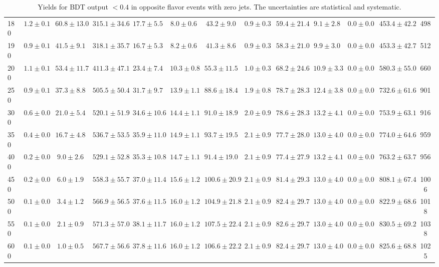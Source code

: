 \begin{table}
{\begin{center}
\begin{tabular}{l | c c | c c c c c c c c  | c c}
180 & $1.2\pm0.1$ & $60.8\pm13.0$ & $315.1\pm34.6$ & $17.7\pm5.5$ & $8.0\pm0.6$ & $43.2\pm9.0$ & $0.9\pm0.3$ & $59.4\pm21.4$ & $9.1\pm2.8$ & $0.0\pm0.0$ & $453.4\pm42.2$ & 498 \\
190 & $0.9\pm0.1$ & $41.5\pm9.1$ & $318.1\pm35.7$ & $16.7\pm5.3$ & $8.2\pm0.6$ & $41.3\pm8.6$ & $0.9\pm0.3$ & $58.3\pm21.0$ & $9.9\pm3.0$ & $0.0\pm0.0$ & $453.3\pm42.7$ & 512 \\
200 & $1.1\pm0.1$ & $53.4\pm11.7$ & $411.3\pm47.1$ & $23.4\pm7.4$ & $10.3\pm0.8$ & $55.3\pm11.5$ & $1.0\pm0.3$ & $68.2\pm24.6$ & $10.9\pm3.3$ & $0.0\pm0.0$ & $580.3\pm55.0$ & 660 \\
250 & $0.9\pm0.1$ & $37.3\pm8.8$ & $505.5\pm50.4$ & $31.7\pm9.7$ & $13.9\pm1.1$ & $88.6\pm18.4$ & $1.9\pm0.8$ & $78.7\pm28.3$ & $12.4\pm3.8$ & $0.0\pm0.0$ & $732.6\pm61.6$ & 901 \\
300 & $0.6\pm0.0$ & $21.0\pm5.4$ & $520.1\pm51.9$ & $34.6\pm10.6$ & $14.4\pm1.1$ & $91.0\pm18.9$ & $2.0\pm0.9$ & $78.6\pm28.3$ & $13.2\pm4.1$ & $0.0\pm0.0$ & $753.9\pm63.1$ & 916 \\
350 & $0.4\pm0.0$ & $16.7\pm4.8$ & $536.7\pm53.5$ & $35.9\pm11.0$ & $14.9\pm1.1$ & $93.7\pm19.5$ & $2.1\pm0.9$ & $77.7\pm28.0$ & $13.0\pm4.0$ & $0.0\pm0.0$ & $774.0\pm64.6$ & 959 \\
400 & $0.2\pm0.0$ & $9.0\pm2.6$ & $529.1\pm52.8$ & $35.3\pm10.8$ & $14.7\pm1.1$ & $91.4\pm19.0$ & $2.1\pm0.9$ & $77.4\pm27.9$ & $13.2\pm4.1$ & $0.0\pm0.0$ & $763.2\pm63.7$ & 956 \\
450 & $0.2\pm0.0$ & $6.0\pm1.9$ & $558.3\pm55.7$ & $37.0\pm11.4$ & $15.6\pm1.2$ & $100.6\pm20.9$ & $2.1\pm0.9$ & $81.4\pm29.3$ & $13.0\pm4.0$ & $0.0\pm0.0$ & $808.1\pm67.4$ & 1006 \\
500 & $0.1\pm0.0$ & $3.4\pm1.2$ & $566.9\pm56.5$ & $37.6\pm11.5$ & $16.0\pm1.2$ & $104.9\pm21.8$ & $2.1\pm0.9$ & $82.4\pm29.7$ & $13.0\pm4.0$ & $0.0\pm0.0$ & $822.9\pm68.6$ & 1018 \\
550 & $0.1\pm0.0$ & $2.1\pm0.9$ & $571.3\pm57.0$ & $38.1\pm11.7$ & $16.0\pm1.2$ & $107.5\pm22.4$ & $2.1\pm0.9$ & $82.6\pm29.7$ & $13.0\pm4.0$ & $0.0\pm0.0$ & $830.5\pm69.2$ & 1038 \\
600 & $0.1\pm0.0$ & $1.0\pm0.5$ & $567.7\pm56.6$ & $37.8\pm11.6$ & $16.0\pm1.2$ & $106.6\pm22.2$ & $2.1\pm0.9$ & $82.4\pm29.7$ & $13.0\pm4.0$ & $0.0\pm0.0$ & $825.6\pm68.8$ & 1025 \\
\hline
\end{tabular}
\end{center}
\caption{Yields for BDT output $<0.4$ in opposite flavor events with zero jets. The uncertainties are statistical and systematic.\label{tab:yields_bdtlo_0j}}}
\end{table}

